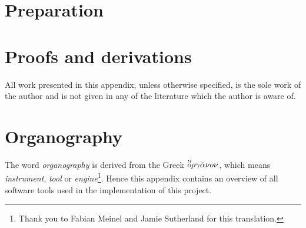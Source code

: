 \documentclass[twoside]{report}
\begin{document}
\chapter{Preparation}




\begin{appendix}
\chapter{Proofs and derivations}
All work presented in this appendix, unless otherwise specified, is the sole work
of the author and is not given in any of the literature which the author is aware of.



\chapter*{Organography}
The word \emph{organography} is derived from the Greek
$\mbox{\makebox[0pt]{\raisebox{1.5pt}{\hspace{6pt}'$'$}}} o\rho\gamma\breve{\alpha}\nu o\nu$,
which means \emph{instrument}, \emph{tool} or \emph{engine}\footnote{Thank you to Fabian Meinel
and Jamie Sutherland for this translation.}. Hence this appendix contains an overview of all
software tools used in the implementation of this project.
\end{appendix}

\end{document}
